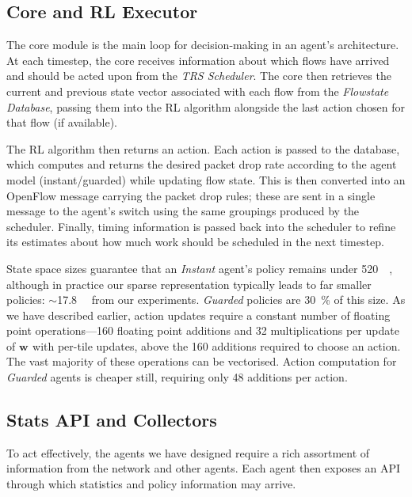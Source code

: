 \documentclass[10pt, times, conference, letterpaper]{IEEEtran}
\newcommand{\wvec}[1]{\ensuremath{\bm{w}_{#1}}}
\begin{document}
\subsection{Core and RL Executor}\label{sec:core-and-rl-executor}
The core module is the main loop for decision-making in an agent's architecture.
At each timestep, the core receives information about which flows have arrived and should be acted upon from the \emph{TRS Scheduler}.
The core then retrieves the current and previous state vector associated with each flow from the \emph{Flowstate Database}, passing them into the RL algorithm alongside the last action chosen for that flow (if available).

The RL algorithm then returns an action.
Each action is passed to the database, which computes and returns the desired packet drop rate according to the agent model (instant/guarded) while updating flow state.
This is then converted into an OpenFlow message carrying the packet drop rules; these are sent in a single message to the agent's switch using the same groupings produced by the scheduler.
Finally, timing information is passed back into the scheduler to refine its estimates about how much work should be scheduled in the next timestep.

State space sizes guarantee that an \emph{Instant} agent's policy remains under \SI{520}{\kibi\byte}, although in practice our sparse representation typically leads to far smaller policies: $\sim$\SI{17.8}{\kibi\byte} from our experiments.
\emph{Guarded} policies are \SI{30}{\percent} of this size.
As we have described earlier, action updates require a constant number of floating point operations---\num{160} floating point additions and \num{32} multiplications per update of $\wvec{}$ with per-tile updates, above the \num{160} additions required to choose an action.
The vast majority of these operations can be vectorised.
Action computation for \emph{Guarded} agents is cheaper still, requiring only \num{48} additions per action.

\subsection{Stats API and Collectors}
To act effectively, the agents we have designed require a rich assortment of information from the network and other agents.
Each agent then exposes an API through which statistics and policy information may arrive.
\end{document}
